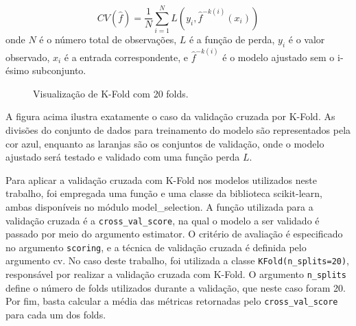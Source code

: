 \documentclass[
  12pt,
  a4paper,
]{scrreprt}
\begin{document}
\[
CV\left(\hat f\right) = \frac{1}{N}\sum_{i = 1}^N L\left(y_i, \hat{f}^{-k\left(i\right)}\left(x_i\right)\right)
\] onde \(N\) é o número total de observações, \(L\) é a função de
perda, \(y_i\)\hspace{0pt} é o valor observado, \(x_i\)\hspace{0pt} é a
entrada correspondente, e \(\hat{f}^{-k\left(i\right)}\) é o modelo
ajustado sem o i-ésimo subconjunto.

\begin{figure}


\caption{\label{fig-kfold}Visualização de K-Fold com 20 folds.}

\end{figure}%

\vspace{12pt}

A figura acima ilustra exatamente o caso da validação cruzada por
K-Fold. As divisões do conjunto de dados para treinamento do modelo são
representados pela cor azul, enquanto as laranjas são os conjuntos de
validação, onde o modelo ajustado será testado e validado com uma função
perda \(L\).

\vspace{12pt}

Para aplicar a validação cruzada com K-Fold nos modelos utilizados neste
trabalho, foi empregada uma função e uma classe da biblioteca
scikit-learn, ambas disponíveis no módulo model\_selection. A função
utilizada para a validação cruzada é a \texttt{cross\_val\_score}, na
qual o modelo a ser validado é passado por meio do argumento estimator.
O critério de avaliação é especificado no argumento \texttt{scoring}, e
a técnica de validação cruzada é definida pelo argumento cv. No caso
deste trabalho, foi utilizada a classe \texttt{KFold(n\_splits=20)},
responsável por realizar a validação cruzada com K-Fold. O argumento
\texttt{n\_splits} define o número de folds utilizados durante a
validação, que neste caso foram 20. Por fim, basta calcular a média das
métricas retornadas pelo \texttt{cross\_val\_score} para cada um dos
folds.
\end{document}
